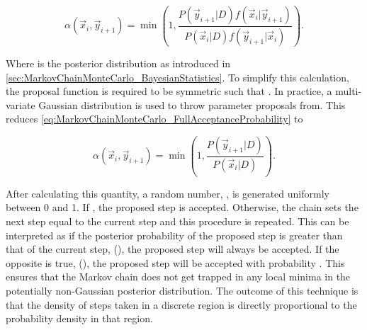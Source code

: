 \begin{equation}
  \label{eq:MarkovChainMonteCarlo_FullAcceptanceProbability}
  \alpha(\vec{x}_{i},\vec{y}_{i+1}) = \min\left(1,\frac{P(\vec{y}_{i+1}|D)f(\vec{x}_{i}|\vec{y}_{i+1})}{P(\vec{x}_{i}|D)f(\vec{y}_{i+1}|\vec{x}_{i})} \right).
\end{equation}

Where  is the posterior distribution as introduced in \autoref{sec:MarkovChainMonteCarlo_BayesianStatistics}. To simplify this calculation, the proposal function is required to be symmetric such that . In practice, a multi-variate Gaussian distribution is used to throw parameter proposals from. This reduces \autoref{eq:MarkovChainMonteCarlo_FullAcceptanceProbability} to

\begin{equation}
  \label{eq:MarkovChainMonteCarlo_ReducedAcceptanceProbability}
  \alpha(\vec{x}_{i},\vec{y}_{i+1}) = \min\left(1,\frac{P(\vec{y}_{i+1}|D)}{P(\vec{x}_{i}|D)} \right).
\end{equation}

After calculating this quantity, a random number, \quickmath{\beta}, is generated uniformly between 0 and 1. If , the proposed step is accepted. Otherwise, the chain sets the next step equal to the current step and this procedure is repeated. This can be interpreted as if the posterior probability of the proposed step is greater than that of the current step, (), the proposed step will always be accepted. If the opposite is true, (), the proposed step will be accepted with probability . This ensures that the Markov chain does not get trapped in any local minima in the potentially non-Gaussian posterior distribution. The outcome of this technique is that the density of steps taken in a discrete region is directly proportional to the probability density in that region.

